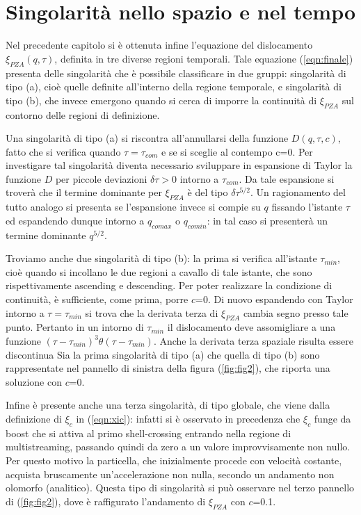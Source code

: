 \section{Singolarità nello spazio e nel tempo}
\label{sec:sing}

Nel precedente capitolo si è ottenuta infine l'equazione del dislocamento $\xi_{PZA}(q,\tau)$, definita in tre
diverse regioni temporali. Tale equazione (\ref{eqn:finale}) presenta delle singolarità che è possibile classificare 
in due gruppi: singolarità di tipo (a), cioè quelle definite all'interno della regione temporale, e 
singolarità di tipo (b), che invece emergono quando si cerca di imporre la continuità di $\xi_{PZA}$ sul contorno 
delle regioni di definizione. 

Una singolarità di tipo (a) si riscontra all'annullarsi della funzione $D(q, \tau, c)$, fatto che si verifica quando 
$\tau = \tau_{com}$ e se si sceglie al contempo c=0. Per investigare tal singolarità diventa necessario sviluppare
in espansione di Taylor la funzione $D$ per piccole deviazioni $\delta\tau>0$ intorno a $\tau_{com}$. Da tale espansione
si troverà che il termine dominante per $\xi_{PZA}$ è del tipo $\delta\tau^{5/2}$. Un ragionamento del tutto analogo si presenta 
se l'espansione invece si compie su $q$ fissando l'istante $\tau$ ed espandendo dunque intorno a $q_{comax}$ o $q_{comin}$:
in tal caso si presenterà un termine dominante $q^{5/2}$. 

Troviamo anche due singolarità di tipo (b): la prima si verifica all'istante $\tau_{min}$, cioè quando si incollano 
le due regioni a cavallo di tale istante, che sono rispettivamente ascending e descending. Per poter realizzare la 
condizione di continuità, è sufficiente, come prima, porre $c$=0. Di nuovo espandendo con Taylor intorno a  $\tau = 
\tau_{min}$ si trova che la derivata terza di $\xi_{PZA}$ cambia segno presso tale punto. Pertanto in un intorno 
di $\tau_{min}$ il dislocamento deve assomigliare a una funzione $(\tau-\tau_{min})^3 \theta(\tau-\tau_{min})$.
Anche la derivata terza spaziale risulta essere discontinua
Sia la prima singolarità di tipo (a) che quella di tipo (b) sono rappresentate nel pannello di sinistra della figura
(\ref{fig:fig2}), che riporta una soluzione con $c$=0.

Infine è presente anche una terza singolarità, di tipo globale, che viene dalla definizione di $\xi_c$ in (\ref{eqn:xic}):
infatti si è osservato in precedenza che $\xi_c$ funge da boost che si attiva al primo shell-crossing entrando nella 
regione di multistreaming, passando quindi da zero a un valore improvvisamente non nullo. Per questo motivo la particella,
che inizialmente procede con velocità costante, acquista bruscamente un'accelerazione non nulla, secondo un andamento
non olomorfo (analitico). Questa tipo di singolarità si può osservare nel terzo pannello di (\ref{fig:fig2}), dove è
raffigurato l'andamento di $\xi_{PZA}$ con $c$=0.1.

